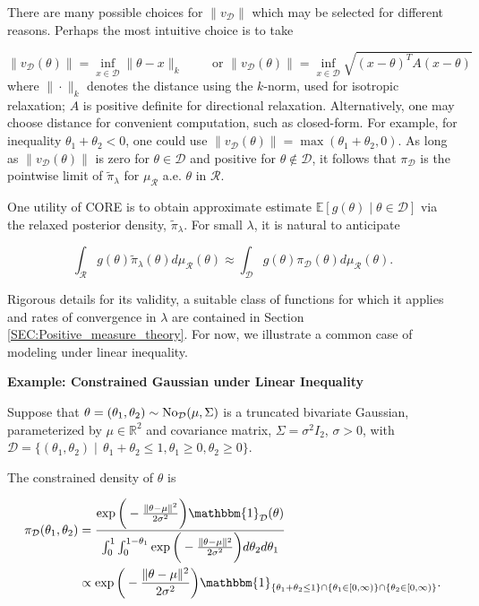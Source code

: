 \documentclass[10pt,fleqn]{article} \pdfoutput=1
\newcommand{\bb}[1]{\mathbb{#1}} \newcommand{\mc}[1]{\mathcal{#1}}
\DeclareMathOperator{\1}{\mathbbm{1}} \DeclareMathOperator{\bigO}{\mc O}
\begin{document}
There are many possible choices for $\|v_{\mathcal D}\|$ which may be selected
for different reasons.  Perhaps the most intuitive choice is to take

$$
\|v_{\mc D}(\theta)\| =
\inf_{x\in\mathcal{D}} \|\theta-x\|_k
\qquad	\text{ or }
\|v_{\mc D}(\theta)\| = \inf_{x\in\mathcal{D}}
\sqrt{(x-\theta)^T A (x-\theta)}$$
where $\|\cdot\|_k$ denotes the distance using the $k$-norm, used
for isotropic relaxation; $A$ is positive definite for directional
relaxation. Alternatively, one may choose distance for convenient computation,
such as closed-form. For example, for inequality $\theta_1+\theta_2<0$,
one could use $\|v_{\mc D}(\theta)\|=\max(\theta_1+\theta_2,0)$. As long as
$\|v_{\mc D}(\theta)\|$ is zero for $\theta \in \mathcal{D}$ and positive
for $\theta\not\in\mathcal{D}$, it follows that $\pi_\mathcal{D}$ is the
pointwise limit of $\tilde{\pi}_\lambda$ for $\mu_\mathcal{R}$ a.e.  $\theta$
in $\mathcal{R}.$

One utility of CORE is to obtain approximate estimate
$\bb E[g(\theta) \mid \theta\in\mathcal{D}]$ via the relaxed
posterior density, $\tilde{\pi}_\lambda$. For small $\lambda$, it is
natural to anticipate

$$\int_\mathcal{R} g(\theta)\tilde{\pi}_\lambda(\theta)
d\mu_\mathcal{R}(\theta) \approx \int_\mathcal{D}
g(\theta)\pi_\mathcal{D}(\theta) d\mu_\mathcal{R}(\theta) .$$

Rigorous
details for its validity, a suitable class of
functions for which it applies and rates of convergence in $\lambda$ are
contained in Section \ref{SEC:Positive_measure_theory}. For now, we
illustrate a common case of modeling under linear inequality.

\textbf{Example: Constrained Gaussian  under Linear Inequality}

Suppose that $\theta = (\theta_1,\theta_2)\sim \No_{\mc D}(\mu, \Sigma)$
is a truncated bivariate Gaussian, parameterized by $\mu \in\mathbb{R}^2$
and covariance matrix, $\Sigma = \sigma^2
I_2$, $\sigma > 0$, with $\mathcal{D} = \{(\theta_1,\theta_2) \mid
\, \theta_1+\theta_2\le 1, \theta_1\ge0, \theta_2 \ge 0\}.$

The constrained density of $\theta$ is

\begin{align*}
\pi_\mathcal{D}(\theta_1,\theta_2) & =
\frac{\exp\bigg(-\frac{\|\theta-\mu\|^2}{2\sigma^2}\bigg)\mathbbm{1}_\mathcal{D}(\theta)}{\int_0^1\int_0^{1-\theta_1}\exp\bigg(-\frac{\|\theta-\mu\|^2}{2\sigma^2}\bigg)d\theta_2d\theta_1}
\\
& \propto
\exp\bigg(-\frac{\|\theta-\mu\|^2}{2\sigma^2}\bigg)
\mathbbm{1}_{\{\theta_1+\theta_2\le 1\}\cap \{\theta_1 \in
[0,\infty)\}\cap \{\theta_2\in[0,\infty)\}} .\end{align*}
\end{document}
